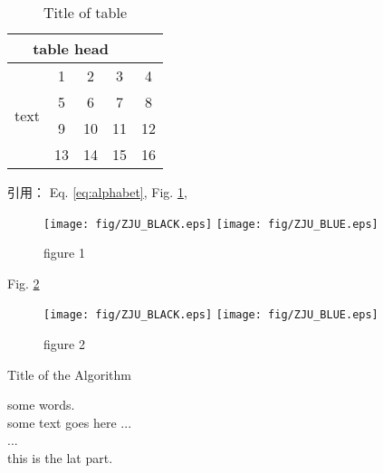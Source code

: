 \documentclass[UTF8,a4paper,10pt, twocolumn]{ctexart}
\begin{document}
\begin{table}[htbp]
  \caption{Title of table} \label{tab:table}
  \centering
  \addtolength{\tabcolsep}{-0mm} %
  \begin{tabular}{ccccc}
    \toprule[0.75pt]	%
    \multicolumn{4}{c}{table head} \\
    \midrule[0.5pt]	%
    \multirow{4}{*}{text} & 1 & 2 & 3 & 4 \\  %
                          & 5 & 6 & 7 & 8 \\
    \cmidrule[0.5pt]{2-4}	%
                          & 9 & 10 & 11 & 12 \\
                          & 13 & 14 & 15 & 16 \\
    \bottomrule[0.75pt]	%
  \end{tabular}
\end{table}
引用： Eq. \eqref{eq:alphabet}, Fig. \ref{figure:zju1},  \\
\begin{figure}[htbp] 
  \centering
  \texttt{[image: fig/ZJU\_BLACK.eps]}
  \texttt{[image: fig/ZJU\_BLUE.eps]}
  \caption{figure 1}		
  \label{figure:zju1}
\end{figure}

Fig. \ref{figure:zju2}
\begin{figure}[htbp] 		
  \centering
  \texttt{[image: fig/ZJU\_BLACK.eps]}
  \texttt{[image: fig/ZJU\_BLUE.eps]}
  \caption{figure 2}
  \label{figure:zju2}		
\end{figure}

\begin{algorithm}
  \caption{Title of the Algorithm}
  \label{algo:ref}
  \begin{algorithmic}[1]
    \REQUIRE some words.  %
    \ENSURE ~\\           %
    some text goes here ... \\
    \STATE ... \\  %
    \ENDWHILE
    \RETURN this is the lat part.  %
  \end{algorithmic}
\end{algorithm}
\end{document}
